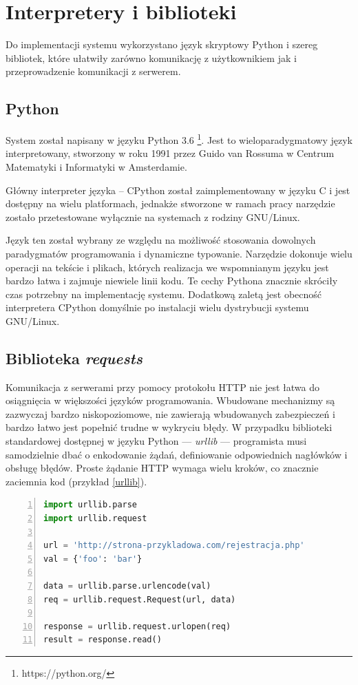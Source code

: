 \documentclass[11pt,a4paper,polish,thesis]{dcsbook}
\begin{document}
\section{Interpretery i biblioteki}
Do implementacji systemu wykorzystano język skryptowy Python i szereg bibliotek, które ułatwiły zarówno komunikację z użytkownikiem jak i przeprowadzenie komunikacji z serwerem.

\subsection{Python}
System został napisany w języku Python 3.6 \footnote{https://python.org/}. Jest to wieloparadygmatowy język interpretowany, stworzony w roku 1991 przez Guido van Rossuma w Centrum Matematyki i Informatyki w Amsterdamie.

Główny interpreter języka -- CPython został zaimplementowany w języku C i jest dostępny na wielu platformach, jednakże stworzone w ramach pracy narzędzie zostało przetestowane wyłącznie na systemach z rodziny GNU/Linux.

Język ten został wybrany ze względu na możliwość stosowania dowolnych paradygmatów programowania i dynamiczne typowanie. Narzędzie dokonuje wielu operacji na tekście i plikach, których realizacja we wspomnianym języku jest bardzo łatwa i zajmuje niewiele linii kodu. Te cechy Pythona znacznie skróciły czas potrzebny na implementację systemu. Dodatkową zaletą jest obecność interpretera CPython domyślnie po instalacji wielu dystrybucji systemu GNU/Linux.

\subsection{Biblioteka \textit{requests}}
Komunikacja z serwerami przy pomocy protokołu HTTP nie jest łatwa do osiągnięcia w większości języków programowania. Wbudowane mechanizmy są zazwyczaj bardzo niskopoziomowe, nie zawierają wbudowanych zabezpieczeń i bardzo łatwo jest popełnić trudne w wykryciu błędy. W przypadku biblioteki standardowej dostępnej w języku Python --- \textit{urllib} --- programista musi samodzielnie dbać o enkodowanie żądań, definiowanie odpowiednich nagłówków i obsługę błędów. Proste żądanie HTTP wymaga wielu kroków, co znacznie zaciemnia kod (przykład \ref{urllib}).

\begin{lstlisting}[language=python,frame=single,caption=Wykorzystanie biblioteki urllib,label=urllib,numbers=left]
import urllib.parse
import urllib.request

url = 'http://strona-przykladowa.com/rejestracja.php'
val = {'foo': 'bar'}

data = urllib.parse.urlencode(val)
req = urllib.request.Request(url, data)

response = urllib.request.urlopen(req)
result = response.read()
\end{lstlisting}
\end{document}
